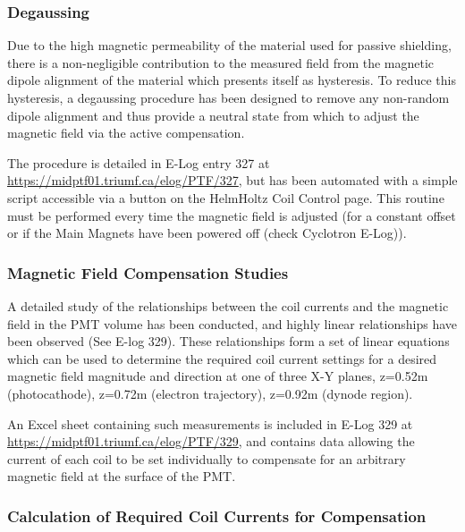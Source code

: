 \documentclass[twoside,letterpaper]{refart}
\begin{document}
\FloatBarrier





\subsubsection{Degaussing}

Due to the high magnetic permeability of the material used for passive shielding, there is a non-negligible contribution to the measured field from the magnetic dipole alignment of the material which presents itself as hysteresis.  To reduce this hysteresis, a degaussing procedure has been designed to remove any non-random dipole alignment and thus provide a neutral state from which to adjust the magnetic field via the active compensation.  

The procedure is detailed in E-Log entry 327 at \url{https://midptf01.triumf.ca/elog/PTF/327}, but has been automated with a simple script accessible via a button on the HelmHoltz Coil Control page. This routine must be performed every time the magnetic field is adjusted (for a constant offset or if the Main Magnets have been powered off (check Cyclotron E-Log)). 


\subsubsection{Magnetic Field Compensation Studies} \label{excelSheet}

A detailed study of the relationships between the coil currents and the magnetic field in the PMT volume has been conducted, and highly linear relationships have been observed (See E-log 329).  These relationships form a set of linear equations which can be used to determine the required coil current settings for a desired magnetic field magnitude and direction at one of three X-Y planes, z=0.52m (photocathode), z=0.72m (electron trajectory), z=0.92m (dynode region).  

An Excel sheet containing such measurements is included in E-Log 329 at \url{https://midptf01.triumf.ca/elog/PTF/329}, and contains data allowing the current of each coil to be set individually to compensate for an arbitrary magnetic field at the surface of the PMT.

\subsubsection{Calculation of Required Coil Currents for Compensation} \label{compensationCalculation}
\end{document}
